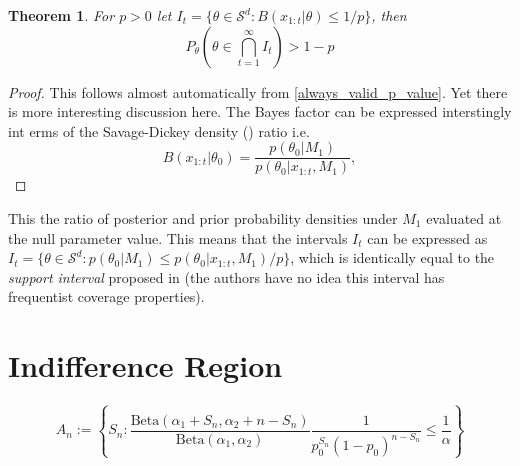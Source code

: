 \documentclass[11pt]{article}
\newcommand{\Beta}{\mathrm{Beta}}
\newtheorem{thm}{Theorem}[section]
\begin{document}
\begin{thm}
  For $p>0$ let $I_t = \lbrace \theta \in \mathcal{S}^d : B(x_{1:t}|\theta) \leq 1/p \rbrace $, then
  \begin{equation}
    \label{eq:always_valid_ci}
    P_{\theta}\left(\theta \in \bigcap_{t=1}^{\infty} I_t\right) > 1-p
  \end{equation}
\end{thm}
\begin{proof}
  This follows almost automatically from \ref{always_valid_p_value}. Yet there is more interesting discussion here. The Bayes factor can be expressed interstingly int erms of the Savage-Dickey density (\cite{dickey}) ratio i.e.
  \begin{equation}
    B(x_{1:t}|\theta_0) = \frac{p(\theta_0| M_1)}{p(\theta_0|x_{1:t},M_1)},
  \end{equation}
\end{proof}
This the ratio of posterior and prior probability densities under $M_1$ evaluated at the null parameter value. This means that the intervals $I_t$ can be expressed as
$I_t = \lbrace \theta \in \mathcal{S}^d : p(\theta_0| M_1)\leq p(\theta_0|x_{1:t}, M_1)/p \rbrace $, which is identically equal to the \textit{support interval} proposed in \cite{support_interval} (the authors have no idea this interval has frequentist coverage properties).


\section{Indifference Region}

\begin{equation}
  A_n := \left\{ S_n : \frac{\Beta(\alpha_1 + S_n, \alpha_2 + n - S_n)}{\Beta(\alpha_1, \alpha_2)} \frac{1}{p_0^{S_n}(1-p_0)^{n-S_n}} \leq \frac{1}{\alpha} \right\}
\end{equation}
\end{document}
